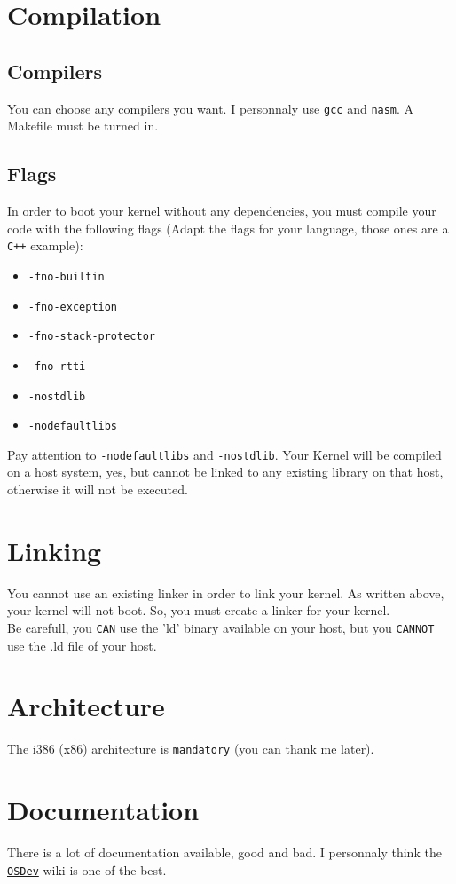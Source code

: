 \documentclass{42-en}
\begin{document}
\newpage

	\section{Compilation}
		\subsection{Compilers}
			You can choose any compilers you want. I personnaly use	\texttt{gcc}
			and \texttt{nasm}. A Makefile must be turned in.
		\subsection{Flags}
			In order to boot your kernel without any dependencies, you must compile
			your code with the following flags (Adapt the flags for your language,
			those ones are a \texttt{C++} example):
			\begin{itemize}\itemsep1pt
				\item \texttt{-fno-builtin}
				\item \texttt{-fno-exception}
				\item \texttt{-fno-stack-protector}
				\item \texttt{-fno-rtti}
				\item \texttt{-nostdlib}
				\item \texttt{-nodefaultlibs}
			\end{itemize}
			Pay attention to \texttt{-nodefaultlibs} and \texttt{-nostdlib}. 
			Your Kernel will be compiled on a host system, yes, but cannot be 
			linked to any existing library on that host, otherwise it will not 
			be executed.
	\section{Linking}
		You cannot use an existing linker in order to link your kernel.
		As written above, your kernel will not boot. So, you must create a linker
		for your kernel.\\
		Be carefull, you \texttt{CAN} use the 'ld' binary available on your host, 
		but you \texttt{CANNOT} use the .ld file of your host.
	\section{Architecture}
		The i386 (x86) architecture is \texttt{mandatory}
		(you can thank me later).
	\section{Documentation}
		There is a lot of documentation available, good and bad.
		I personnaly think the \texttt{\href{http://wiki.osdev.org/Main_Page}
		{OSDev}} wiki is one of the best.
\end{document}
